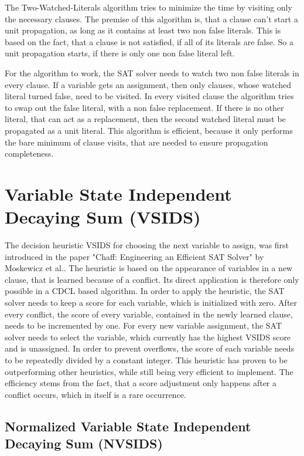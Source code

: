 The Two-Watched-Literals algorithm tries to minimize the time by visiting only the necessary clauses. The premise of this algorithm is, that a clause can't start a unit propagation, as long as it contains at least two non false literals. This is based on the fact, that a clause is not satisfied, if all of its literals are false. So a unit propagation starts, if there is only one non false literal left. \cite{moskewicz2001chaff}

For the algorithm to work, the SAT solver needs to watch two non false literals in every clause. If a variable gets an assignment, then only clauses, whose watched literal turned false, need to be visited. In every visited clause the algorithm tries to swap out the false literal, with a non false replacement. If there is no other literal, that can act as a replacement, then the second watched literal must be propagated as a unit literal. This algorithm is efficient, because it only performs the bare minimum of clause visits, that are needed to ensure propagation completeness. \cite{moskewicz2001chaff}

\section{Variable State Independent Decaying Sum (VSIDS)}
\label{sec:VSIDS}

The decision heuristic VSIDS for choosing the next variable to assign, was first introduced in the paper "Chaff: Engineering an Efficient SAT Solver" \cite{moskewicz2001chaff} by Moskewicz et al.. The heuristic is based on the appearance of variables in a new clause, that is learned because of a conflict. Its direct application is therefore only possible in a CDCL based algorithm. In order to apply the heuristic, the SAT solver needs to keep a score for each variable, which is initialized with zero. After every conflict, the score of every variable, contained in the newly learned clause, needs to be incremented by one. For every new variable assignment, the SAT solver needs to select the variable, which currently has the highest VSIDS score and is unassigned. In order to prevent overflows, the score of each variable needs to be repeatedly divided by a constant integer. This heuristic has proven to be outperforming other heuristics, while still being very efficient to implement. The efficiency stems from the fact, that a score adjustment only happens after a conflict occurs, which in itself is a rare occurrence.

\subsection{Normalized Variable State Independent Decaying Sum (NVSIDS)}
\label{sec:NVSIDS}

